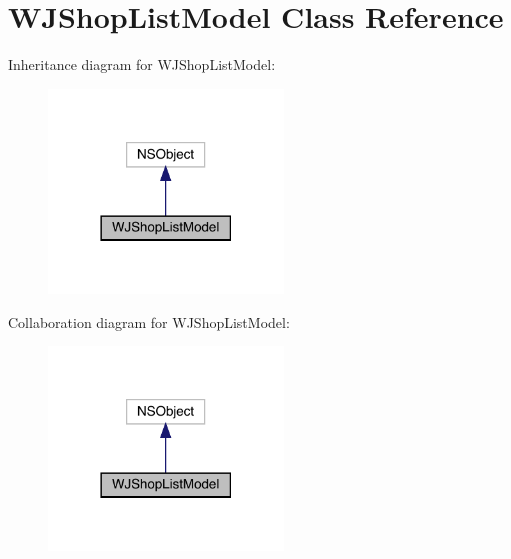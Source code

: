 \hypertarget{interface_w_j_shop_list_model}{}\section{W\+J\+Shop\+List\+Model Class Reference}
\label{interface_w_j_shop_list_model}


Inheritance diagram for W\+J\+Shop\+List\+Model\+:\nopagebreak
\begin{figure}[H]
\begin{center}
\leavevmode
\includegraphics[width=177pt]{interface_w_j_shop_list_model__inherit__graph}
\end{center}
\end{figure}


Collaboration diagram for W\+J\+Shop\+List\+Model\+:\nopagebreak
\begin{figure}[H]
\begin{center}
\leavevmode
\includegraphics[width=177pt]{interface_w_j_shop_list_model__coll__graph}
\end{center}
\end{figure}
